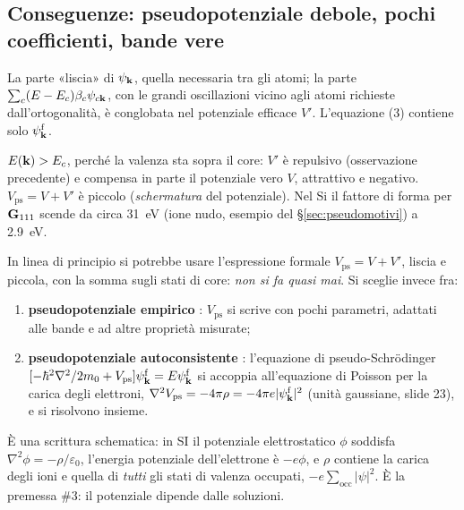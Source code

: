 \documentclass[11pt,a4paper]{article}
\begin{document}
\subsection{Conseguenze: pseudopotenziale debole, pochi coefficienti, bande vere}\label{sec:pseudoconseg}
La parte «liscia» di $\psi_{\mathbf k}$, quella necessaria tra gli atomi; la parte $\sum_c(E-E_c)\beta_c\psi_{c\mathbf k}$, con le grandi oscillazioni vicino agli
atomi richieste dall'ortogonalità, è conglobata nel potenziale efficace $V'$. L'equazione (3) contiene solo $\psi^{\mathrm f}_{\mathbf k}$.

$E(\mathbf k)>E_c$, perché la valenza sta sopra il core: $V'$ è repulsivo (osservazione precedente) e compensa in parte il potenziale vero $V$, attrattivo e
negativo. $V_{\mathrm{ps}}=V+V'$ è piccolo (\emph{schermatura} del potenziale). Nel Si il fattore di forma per $\mathbf G_{111}$ scende da circa
\SI{31}{eV} (ione nudo, esempio del §\ref{sec:pseudomotivi}) a \SI{2.9}{eV}.

In linea di principio si potrebbe usare l'espressione formale $V_{\mathrm{ps}}=V+V'$, liscia e piccola, con la somma sugli stati di core: \emph{non si fa
quasi mai}. Si sceglie invece fra:
\begin{enumerate}[leftmargin=*, label=\arabic*.]
\item \textbf{pseudopotenziale empirico} : $V_{\mathrm{ps}}$ si scrive con pochi parametri, adattati alle bande
e ad altre proprietà misurate;
\item \textbf{pseudopotenziale autoconsistente} : l'equazione di pseudo-Schrödinger
$[-\hbar^2\nabla^2/2m_0+V_{\mathrm{ps}}]\psi^{\mathrm f}_{\mathbf k}=E\psi^{\mathrm f}_{\mathbf k}$ si accoppia all'equazione di Poisson per la carica degli
elettroni, $\nabla^2V_{\mathrm{ps}}=-4\pi\rho=-4\pi e|\psi^{\mathrm f}_{\mathbf k}|^2$ (unità gaussiane, slide 23), e si risolvono insieme.
\end{enumerate}
\begin{osservazione}
È una scrittura schematica: in SI il potenziale elettrostatico $\phi$ soddisfa $\nabla^2\phi=-\rho/\varepsilon_0$, l'energia potenziale
dell'elettrone è $-e\phi$, e $\rho$ contiene la carica degli ioni e quella di \emph{tutti} gli stati di valenza occupati, $-e\sum_{\text{occ}}|\psi|^2$.
È la premessa \#3: il potenziale dipende dalle soluzioni.
\end{osservazione}
\end{document}
